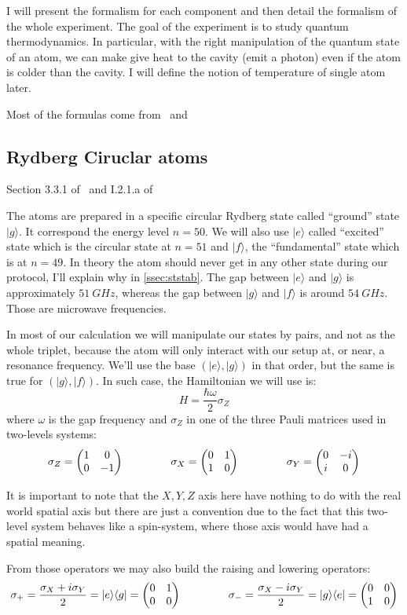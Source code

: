 \documentclass[10pt]{report}
\theoremstyle{plain}
\theoremstyle{definition}
\theoremstyle{remark}
\newcommand{\ket}[1]{|#1\rangle}
\newcommand{\bra}[1]{\langle#1|}
\newcommand{\mat}[1]{\begin{pmatrix}#1\end{pmatrix}}
\newcommand{\gap}{\hspace{1.5cm}}
\newcommand{\twoline}{\vphantom{\frac\int\int}}
\begin{document}
I will present the formalism for each component and then detail the formalism of
the whole experiment. The goal of the experiment is to study quantum
thermodynamics. In particular, with the right manipulation of the quantum state
of an atom, we can make give heat to the cavity (emit a photon) even if the atom
is colder than the cavity. I will define the notion of temperature of single
atom later.

Most of the formulas come from~\cite{Har06} and~\cite{SayPHD11}


\subsection{Rydberg Ciruclar atoms}

Section 3.3.1 of~\cite{Har06} and I.2.1.a of~\cite{SayPHD11}

The atoms are prepared in a specific circular Rydberg state called ``ground'' state
$\ket g$. It correspond the energy level $n = 50$. We will also use $\ket e$
called ``excited'' state which is the circular state at $n = 51$ and $\ket f$, the
``fundamental'' state which is at $n = 49$. In theory the atom should never get
in any other state during our protocol, I'll explain why in \cref{ssec:ststab}.
The gap between $\ket e$ and $\ket g$ is
approximately $\SI{51}{GHz}$, whereas the gap between $\ket g$ and $\ket f$ is
around $\SI{54}{GHz}$. Those are microwave frequencies.

In most of our calculation we will manipulate our states by pairs, and not as the
whole triplet, because the atom will only interact with our setup at, or near,
a resonance frequency. We'll use the base $(\ket e, \ket g)$ in that order, but
the same is true for $(\ket g, \ket f)$. In such case, the Hamiltonian we will
use is:
\[H = \frac {\hbar \omega}2 \sigma_Z\]
 where $\omega$ is the gap frequency and $\sigma_Z$ in one of the
 three Pauli matrices used in two-levels systems:
\[\twoline \sigma_Z = \mat{1&0\\0&-1} \gap \sigma_X = \mat{0&1\\1&0} \gap
  \sigma_Y = \mat{0&-i\\i&0}\]

It is important to note that the $X,Y,Z$ axis here have nothing to do with the
real world spatial axis but there are just a convention due to the fact that
this two-level system behaves like a spin-system, where those axis would have had a
spatial meaning.

From those operators we may also build the raising and lowering operators:
\[\sigma_+ = \frac{\sigma_X + i \sigma_Y}2 = \ket e \bra g = \mat{0&1\\0&0}
  \gap
  \sigma_- = \frac{\sigma_X - i \sigma_Y}2 = \ket g \bra e= \mat{0&0\\1&0}\]
\end{document}
